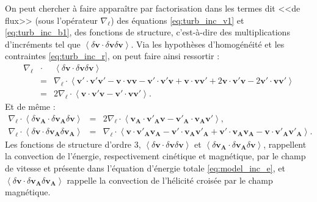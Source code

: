 On peut  chercher à faire apparaître par factorisation dans les termes dit <<de flux>> (sous l'opérateur $\nabla_{\boldsymbol{\ell}} $) des équations \eqref{eq:turb_inc_v1} et \eqref{eq:turb_inc_b1}, des fonctions de structure, c'est-à-dire des multiplications d'incréments tel que $\left<\delta \boldsymbol{v} \cdot \delta \boldsymbol{v} \delta \boldsymbol{v} \right>$. Via les hypothèses d'homogénéité et les contraintes \eqref{eq:turb_inc_r}, on peut faire ainsi ressortir : 
\begin{eqnarray}
\label{eq:turb_inc_fs1} \nabla_{\boldsymbol{\ell}} &\cdot& \left<\delta \boldsymbol{v} \cdot \delta \boldsymbol{v} \delta \boldsymbol{v} \right> \nonumber \\
 &=&  \nabla_{\boldsymbol{\ell}} \cdot \left<  \boldsymbol{v'} \cdot \boldsymbol{v'} \boldsymbol{v'} - \boldsymbol{v} \cdot \boldsymbol{v} \boldsymbol{v} - \boldsymbol{v'} \cdot \boldsymbol{v'} \boldsymbol{v} + \boldsymbol{v} \cdot \boldsymbol{v} \boldsymbol{v'} + 2 \boldsymbol{v} \cdot \boldsymbol{v'} \boldsymbol{v} - 2 \boldsymbol{v'} \cdot \boldsymbol{v} \boldsymbol{v'}\right>  \nonumber\\
  &=& 2 \nabla_{\boldsymbol{\ell}} \cdot \left< \boldsymbol{v} \cdot \boldsymbol{v'} \boldsymbol{v} - \boldsymbol{v'} \cdot \boldsymbol{v} \boldsymbol{v'}\right>.
\end{eqnarray}
Et de même : 
\begin{eqnarray}
\label{eq:turb_inc_fs2}  \nabla_{\boldsymbol{\ell}} \cdot \left<\delta \boldsymbol{v_A} \cdot \delta \boldsymbol{v_A} \delta \boldsymbol{v} \right>  &=& 2 \nabla_{\boldsymbol{\ell}} \cdot \left< \boldsymbol{v_A} \cdot \boldsymbol{v'_A} \boldsymbol{v} - \boldsymbol{v'_A} \cdot \boldsymbol{v_A} \boldsymbol{v'}\right> ,\\
\label{eq:turb_inc_fs3}   \nabla_{\boldsymbol{\ell}} \cdot \left<\delta \boldsymbol{v} \cdot \delta \boldsymbol{v_A} \delta \boldsymbol{v_A} \right>  &=&  \nabla_{\boldsymbol{\ell}} \cdot \left< \boldsymbol{v} \cdot \boldsymbol{v'_A} \boldsymbol{v_A} - \boldsymbol{v'} \cdot \boldsymbol{v_A} \boldsymbol{v'_A} + \boldsymbol{v'} \cdot \boldsymbol{v_A} \boldsymbol{v_A} - \boldsymbol{v} \cdot \boldsymbol{v'_A} \boldsymbol{v'_A}\right> .\quad
\end{eqnarray}
Les fonctions de structure d'ordre 3, $\left<\delta \boldsymbol{v} \cdot \delta \boldsymbol{v} \delta \boldsymbol{v} \right>$ et $\left<\delta \boldsymbol{v_A} \cdot \delta \boldsymbol{v_A} \delta \boldsymbol{v} \right>$, rappellent la convection de l'énergie, respectivement cinétique et magnétique, par le champ de vitesse et présente dans l'équation d'énergie totale \eqref{eq:model_inc_e}, et $\left<\delta \boldsymbol{v} \cdot \delta \boldsymbol{v_A} \delta \boldsymbol{v_A} \right>$ rappelle la convection de l'hélicité croisée par le champ magnétique.


